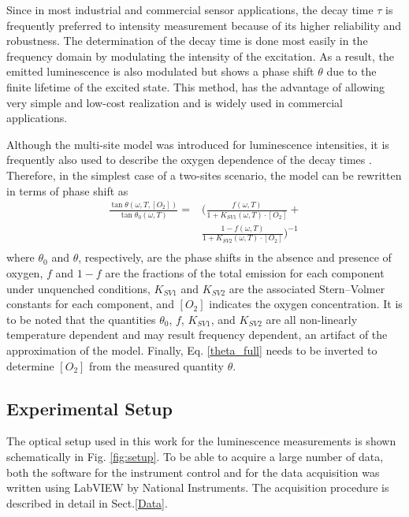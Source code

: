 \documentclass[9pt,twocolumn,twoside,pdftex]{optica}
\begin{document}
Since in most industrial and commercial sensor applications, the decay time $\tau$ is frequently preferred to intensity measurement because of its higher reliability and robustness. The determination of the decay time is done most easily in the frequency domain by modulating the intensity of the excitation.  As a result, the emitted luminescence is also modulated but shows a phase shift $\theta$ due to the finite lifetime of the excited state. This method, has the advantage of allowing very simple and low-cost realization and is widely used in commercial applications.

Although the multi-site model was introduced for luminescence intensities, it is frequently also used to describe the oxygen dependence of the decay times \cite{Demas1995,Quaranta2012}. Therefore, in the simplest case of a two-sites scenario, the model can be rewritten in terms of phase shift as \cite{Michelucci2019}
\begin{equation}
\begin{aligned}
\frac{\tan \theta (\omega, T, [O_2])}{\tan \theta_0 (\omega, T)} =& \bigg( \frac{f (\omega , T) }{1+K_{SV1} (\omega , T) \cdot \left[O_2\right]}+ \\
&\frac{1-f (\omega , T) }{1+K_{SV2} (\omega , T) \cdot \left[O_2\right]} \bigg)^{-1} \\
\label{theta_full}
\end{aligned}
\end{equation}
where $\theta_0$ and $\theta$, respectively, are the phase shifts in the absence and presence of oxygen, $f$ and $1-f$ are the fractions of the total emission for each component under unquenched conditions, $K_{SV1}$ and $K_{SV2}$ are the associated Stern–Volmer constants for each component, and $\left[O_2\right]$ indicates the oxygen concentration. It is to be noted that the quantities $\theta_0$, $f$, $K_{SV1}$, and $K_{SV2}$ are all non-linearly temperature dependent and may result frequency dependent, an artifact of the approximation of the model. Finally, Eq. \ref{theta_full} needs to be inverted to determine $[O_2]$ from the measured quantity $\theta$.


\subsection{Experimental Setup}
\label{Experimental}


The optical setup used in this work for the luminescence measurements is shown schematically in Fig. \ref{fig:setup}. To be able to acquire a large number of data, both the software for the instrument control and for the data acquisition was written using LabVIEW by National Instruments. The acquisition procedure is described in detail in Sect.\ref{Data}.
\end{document}
